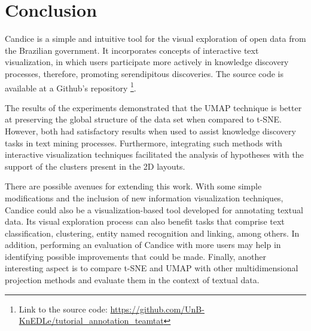 \documentclass[conference]{IEEEtran}
\begin{document}
\section{Conclusion}

Candice is a simple and intuitive tool for the visual exploration of open data from the Brazilian government. It incorporates concepts of interactive text visualization, in which users participate more actively in knowledge discovery processes, therefore, promoting serendipitous discoveries. The source code is available at a Github's repository \footnote{Link to the source code: \url{https://github.com/UnB-KnEDLe/tutorial\_annotation\_teamtat}}.

The results of the experiments demonstrated that the UMAP technique is better at preserving the global structure of the data set when compared to t-SNE. However, both had satisfactory results when used to assist knowledge discovery tasks in text mining processes. Furthermore, integrating such methods with interactive visualization techniques facilitated the analysis of hypotheses with the support of the clusters present in the 2D layouts.

There are possible avenues for extending this work. With some simple modifications and the inclusion of new information visualization techniques, Candice could also be a visualization-based tool developed for annotating textual data. Its visual exploration process can also benefit tasks that comprise text classification, clustering, entity named recognition and linking, among others. In addition, performing an evaluation of Candice with more users may help in identifying possible improvements that could be made. Finally, another interesting aspect is to compare t-SNE and UMAP with other multidimensional projection methods and evaluate them in the context of textual data. 
\end{document}
